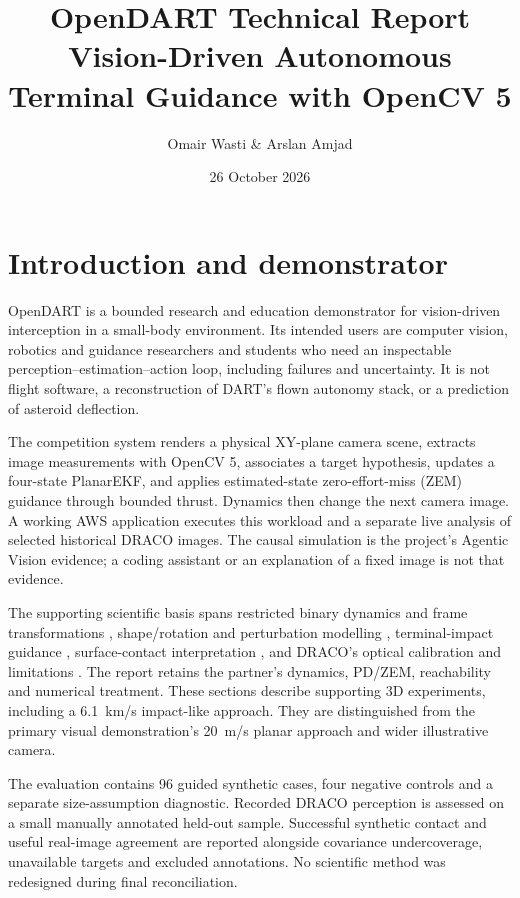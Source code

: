 \documentclass[11pt,a4paper]{article}
\title{\textbf{OpenDART Technical Report}\\\large Vision-Driven Autonomous Terminal Guidance with OpenCV 5}
\author{Omair Wasti \& Arslan Amjad}
\date{26 October 2026}
\begin{document}
\maketitle
\section{Introduction and demonstrator}
OpenDART is a bounded research and education demonstrator for vision-driven interception in a small-body environment. Its intended users are computer vision, robotics and guidance researchers and students who need an inspectable perception--estimation--action loop, including failures and uncertainty. It is not flight software, a reconstruction of DART's flown autonomy stack, or a prediction of asteroid deflection.

The competition system renders a physical XY-plane camera scene, extracts image measurements with OpenCV 5, associates a target hypothesis, updates a four-state PlanarEKF, and applies estimated-state zero-effort-miss (ZEM) guidance through bounded thrust. Dynamics then change the next camera image. A working AWS application executes this workload and a separate live analysis of selected historical DRACO images. The causal simulation is the project's Agentic Vision evidence; a coding assistant or an explanation of a fixed image is not that evidence.

The supporting scientific basis spans restricted binary dynamics and frame transformations \cite{gabern}, shape/rotation and perturbation modelling \cite{voyatzis}, terminal-impact guidance \cite{atchison}, surface-contact interpretation \cite{bigot}, and DRACO's optical calibration and limitations \cite{ernst}. The report retains the partner's dynamics, PD/ZEM, reachability and numerical treatment. These sections describe supporting 3D experiments, including a 6.1~km/s impact-like approach. They are distinguished from the primary visual demonstration's 20~m/s planar approach and wider illustrative camera.

The evaluation contains 96 guided synthetic cases, four negative controls and a separate size-assumption diagnostic. Recorded DRACO perception is assessed on a small manually annotated held-out sample. Successful synthetic contact and useful real-image agreement are reported alongside covariance undercoverage, unavailable targets and excluded annotations. No scientific method was redesigned during final reconciliation.
\end{document}
